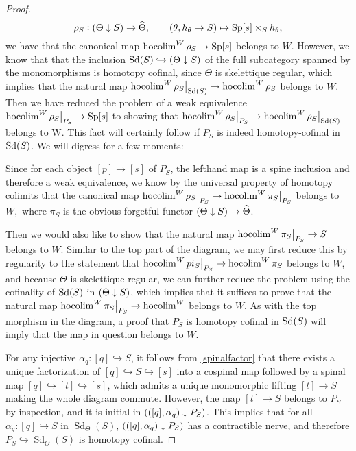 \begin{proof}
\[\rho_S:{(\Theta\downarrow S)}\to \widehat{\Theta}, \qquad (\theta,h_\theta\to S)\mapsto {\operatorname{Sp}}[s] \times_S h_\theta,\]
we have that the canonical map \(\operatorname{hocolim}^W \rho_S \to {\operatorname{Sp}}[s]\) belongs to \(W\).  However, we know that that the inclusion  \({\operatorname{Sd}}(S)\hookrightarrow {(\Theta\downarrow S)}\) of the full subcategory spanned by the monomorphisms is homotopy cofinal, since \(\Theta\) is skelettique regular, which implies that the natural map \(\hocolim^W \eval[1]{\rho_S}_{\Sd(S)}\to \hocolim^W \rho_S\) belongs to \(W\).  Then we have reduced the problem of a weak equivalence \(\hocolim^W\eval[1]{\rho_S}_{P_S} \to \Sp[s]\) to showing that \(\hocolim^W\eval[1]{\rho_S}_{P_S}\to \hocolim^W \eval[1]{\rho_S}_{\Sd(S)}\) belongs to W.  This fact will certainly follow if \(P_S\) is indeed homotopy-cofinal in \({\operatorname{Sd}}(S)\).  We will digress for a few moments:

Since for each object \([p]\to [s]\) of \(P_S\), the lefthand map is a spine inclusion and therefore a weak equivalence, we know by the universal property of homotopy colimits that the canonical map \(\hocolim^W\eval[1]{\rho_S}_{P_S}\to \hocolim^W\eval[1]{\pi_S}_{P_S}\) belongs to \(W,\) where \(\pi_S\) is the obvious forgetful functor \({(\Theta\downarrow S)}\to \widehat{\Theta}\).

Then we would also like to show that the natural map \(\hocolim^W\eval[1]{\pi_S}_{P_S}\to S\) belongs to \(W\).  Similar to the top part of the diagram, we may first reduce this by regularity to the statement that \(\hocolim^W\eval[1]{pi_S}_{P_S}\to \hocolim^W{\pi_S}\) belongs to \(W\), and because \(\Theta\) is skelettique regular, we can further reduce the problem using the cofinality of \({\operatorname{Sd}}(S)\) in \({(\Theta\downarrow S)}\), which implies that it suffices to prove that the natural map \(\hocolim^W\eval[1]{\pi_S}_{P_S}\to \hocolim^W\) belongs to \(W\).  As with the top morphism in the diagram, a proof that \(P_S\) is homotopy cofinal in \({\operatorname{Sd}}(S)\) will imply that the map in question belongs to \(W\).  

For any injective \(\alpha_q:[q]\hookrightarrow S\), it follows from \eqref{spinalfactor} that there exists a unique factorization of \([q]\hookrightarrow S\hookrightarrow [s]\) into a cospinal map followed by a spinal map \([q]\hookrightarrow [t]\hookrightarrow [s]\), which admits a unique monomorphic lifting \([t]\to S\) making the whole diagram commute.  However, the map \([t]\to S\) belongs to \(P_S\) by inspection, and it is initial in \({(([q],\alpha_q)\downarrow P_S)}\).  This implies that for all \(\alpha_q:[q]\hookrightarrow S\) in \(\operatorname{Sd}_\Theta(S)\), \({(([q],\alpha_q)\downarrow P_S)}\) has a contractible nerve, and therefore \(P_S\hookrightarrow \operatorname{Sd}_\Theta(S)\) is homotopy cofinal.  
\end{proof}

